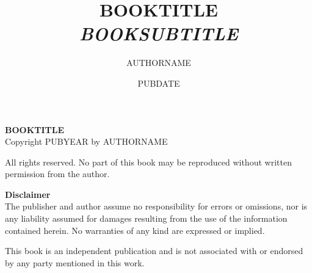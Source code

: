 
\title{\HUGE\textbf{\textsf{BOOKTITLE}}\\ \vspace*{10pt} \Large \textit{BOOKSUBTITLE}}

\author{AUTHORNAME}
\date{PUBDATE}

\maketitle

\pagebreak
\vfill

{\Large{\textbf{\textsc{BOOKTITLE}}}}\\
Copyright \textcopyright PUBYEAR by AUTHORNAME
\vspace{.5cm}

All rights reserved.
No part of this book may be reproduced without written permission from the author.

\vfill
\textbf{Disclaimer}\\
The publisher and author assume no responsibility for errors or omissions, nor is any liability assumed for damages resulting from the use of the information contained herein.
No warranties of any kind are expressed or implied.

This book is an independent publication and is not associated with or endorsed by any party mentioned in this work.



\thispagestyle{empty}
